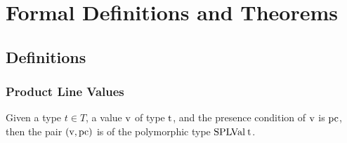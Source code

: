\documentclass[11pt]{article} %
\begin{document}






\section{Formal Definitions and Theorems}

\subsection{Definitions}
\subsubsection{Product Line Values}
Given a type $t \in T$,  a value $\var{v}$ of type $\type{t}$, and the presence condition of $\var{v}$ is $\var{pc}$, then the pair $(\var{v}, \term{pc})$ is of the polymorphic type $\type{SPLVal} \: \type{t}$.

\begin{prooftree}
\end{prooftree}
\end{document}
